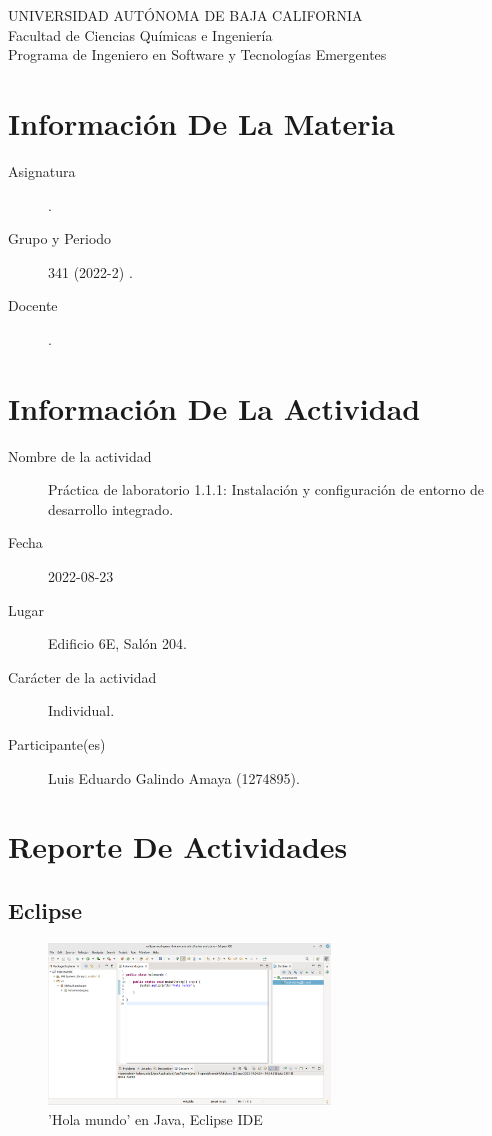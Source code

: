 \documentclass[12pt]{article}
\begin{document}
\thispagestyle{empty}
\begin{center}
	{\large
		UNIVERSIDAD AUTÓNOMA DE BAJA CALIFORNIA \\
		Facultad de Ciencias Químicas e Ingeniería }
	\vspace{0.25in} \\
	Programa de Ingeniero en Software y Tecnologías Emergentes
\end{center}

\section*{Información De La Materia}
\label{sec:org7f9e35c}
\begin{mdframed}
\begin{description}
\item[{Asignatura}] \asignatura .
\item[{Grupo y Periodo}] 341 (2022-2) .
\item[{Docente}] \docente .
\end{description}
\end{mdframed}

\section*{Información De La Actividad}
\label{sec:orgac31032}
\begin{mdframed}
\begin{description}
\item[{Nombre de la actividad}] Práctica de laboratorio 1.1.1: Instalación y configuración de entorno de desarrollo integrado.
\item[{Fecha}] 2022-08-23
\item[{Lugar}] Edificio 6E, Salón 204.
\item[{Carácter de la actividad}] Individual.
\item[{Participante(es)}] Luis Eduardo Galindo Amaya (1274895).
\end{description}
\end{mdframed}

\section*{Reporte De Actividades}
\label{sec:org3085093}
\subsection*{Eclipse}
\label{sec:org828d822}
\begin{figure}[htbp]
\centering
\includegraphics[width=7.5cm]{./img/eclipse.png}
\caption{'Hola mundo' en Java, Eclipse IDE}
\end{figure}
\end{document}
